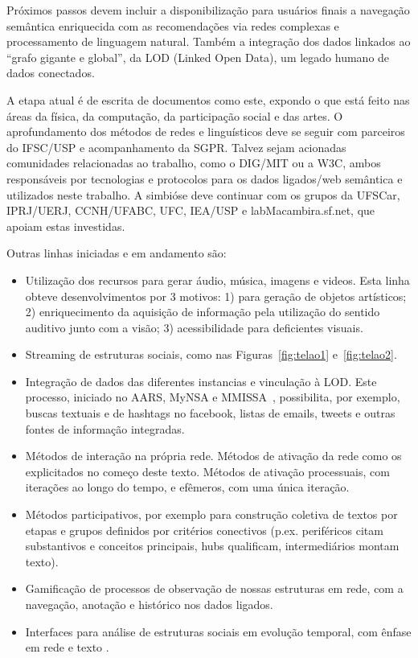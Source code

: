 \documentclass[a4paper, 11pt]{article} %
\begin{document}
Próximos passos devem incluir a disponibilização para usuários finais a navegação semântica enriquecida com as recomendações via redes complexas e processamento de linguagem natural. Também a integração dos dados linkados ao ``grafo gigante e global'', da LOD (Linked Open Data), um legado humano de dados conectados.

A etapa atual é de escrita de documentos como este, expondo o que está feito nas áreas da física, da computação, da participação social e das artes. O aprofundamento dos métodos de redes e linguísticos deve se seguir com parceiros do IFSC/USP e acompanhamento da SGPR. Talvez sejam acionadas comunidades relacionadas ao trabalho, como o DIG/MIT ou a W3C, ambos responsáveis por tecnologias e protocolos para os dados ligados/web semântica e utilizados neste trabalho. A simbióse deve continuar com os grupos da UFSCar, IPRJ/UERJ, CCNH/UFABC, UFC, IEA/USP e labMacambira.sf.net, que apoiam estas investidas.

Outras linhas iniciadas e em andamento são:
\begin{itemize}
\item Utilização dos recursos para gerar áudio, música, imagens e videos. Esta linha obteve desenvolvimentos por 3 motivos: 1) para geração de objetos artísticos; 2) enriquecimento da aquisição de informação pela utilização do sentido auditivo junto com a visão; 3) acessibilidade para deficientes visuais.
\item Streaming de estruturas sociais, como nas Figuras~\ref{fig:telao1} e~\ref{fig:telao2}.
\item Integração de dados das diferentes instancias e vinculação à LOD. Este processo, iniciado no AARS, MyNSA e MMISSA~\cite{mynsa,mmissa}, possibilita, por exemplo, buscas textuais e de hashtags no facebook, listas de emails, tweets e outras fontes de informação integradas.
\item Métodos de interação na própria rede. Métodos de ativação da rede como os explicitados no começo deste texto. Métodos de ativação processuais, com iterações ao longo do tempo, e efêmeros, com uma única iteração.
\item Métodos participativos, por exemplo para construção coletiva de textos por etapas e grupos definidos por critérios conectivos (p.ex. periféricos citam substantivos e conceitos principais, hubs qualificam, intermediários montam texto).
\item Gamificação de processos de observação de nossas estruturas em rede, com a navegação, anotação e histórico nos dados ligados.
\item Interfaces para análise de estruturas sociais em evolução temporal, com ênfase em rede e texto .
\end{itemize}
\end{document}
